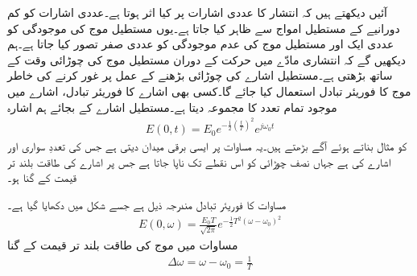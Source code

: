 آئیں دیکھتے ہیں کہ انتشار کا عددی اشارات پر کیا اثر ہوتا ہے۔عددی اشارات کو کم دورانیے کے مستطیل امواج سے ظاہر کیا جاتا ہے۔یوں مستطیل موج کی موجودگی کو عددی ایک  اور مستطیل موج کی عدم موجودگی کو عددی صفر  تصور کیا جاتا ہے۔ہم دیکھیں گے کہ انتشاری مادّے میں حرکت کے دوران مستطیل موج کی چوڑائی وقت کے ساتھ  بڑھتی ہے۔مستطیل اشارے کی چوڑائی بڑھنے کے عمل پر غور کرنے کی خاطر موج کا فوریئر تبادل استعمال کیا جائے گا۔کسی بھی اشارے کا فوریئر تبادل، اشارے میں موجود تمام تعدد کا مجموعہ دیتا ہے۔مستطیل اشارے کے بجائے ہم  اشارہ
\begin{align}\label{مساوات_ترچھی_انتشار_گاوسی_اشارہ}
E(0,t)=E_0 e^{-\tfrac{1}{2} \left(\tfrac{t}{T}\right)^2} e^{j \omega_0 t}
\end{align}
 کو مثال بناتے ہوئے آگے بڑھتے ہیں۔یہ مساوات  پر ایسی برقی میدان دیتی ہے جس کی تعددِ سواری   اور  اشارے کی    ہے  جہاں  نصف چوڑائی  کو اس نقطے تک ناپا جاتا ہے جس پر اشارے کی طاقت بلند تر قیمت کے   گنا ہو۔


مساوات  کا فوریئر تبادل مندرجہ ذیل ہے جسے شکل  میں دکھایا گیا ہے۔
\begin{align}\label{مساوات_ترچھی_انتشار_گاوسی_فوریئر_بدل}
E(0,\omega)=\frac{E_0 T}{\sqrt{2\pi}} e^{-\tfrac{1}{2} T^2 (\omega-\omega_0)^2}
\end{align}
مساوات  میں موج کی طاقت بلند تر قیمت کے  گنا 
\begin{align}\label{مساوات_ترچھی_انتشار_نصف_چوڑائی}
\Delta \omega=\omega-\omega_0=\frac{1}{T}
\end{align}

